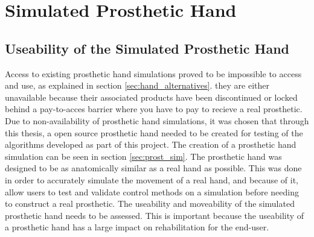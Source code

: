 \documentclass[../main.tex]{subfiles}
\begin{document}




\newpage
\section{Simulated Prosthetic Hand}

\subsection{Useability of the Simulated Prosthetic Hand}

Access to existing prosthetic hand simulations proved to be impossible to access and use, as explained in section \ref{sec:hand_alternatives}. they are either unavailable because their associated products have been discontinued or locked behind a pay-to-acces barrier where you have to pay to recieve a real prosthetic.
Due to non-availability of prosthetic hand simulations, it was chosen that through this thesis, a open source prosthetic hand needed to be created for testing of the algorithms developed as part of this project.
The creation of a prosthetic hand simulation can be seen in section \ref{sec:prost_sim}.
The prosthetic hand was designed to be as anatomically similar as a real hand as possible.
This was done in order to accurately simulate the movement of a real hand, and because of it, allow users to test and validate control methods on a simulation before needing to construct a real prosthetic.
The useability and moveability of the simulated prosthetic hand needs to be assessed.
This is important because the useability of a prosthetic hand has a large impact on rehabilitation for the end-user.
\end{document}
